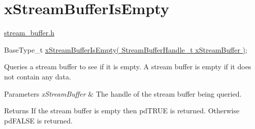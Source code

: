 \hypertarget{group__x_stream_buffer_is_empty}{}\section{x\+Stream\+Buffer\+Is\+Empty}
\label{group__x_stream_buffer_is_empty}
\hyperlink{stream__buffer_8h}{stream\+\_\+buffer.\+h}


\begin{DoxyPre}
BaseType\_t \hyperlink{stream__buffer_8h_af65cd558025ddc29ca68fba1b3f5dc19}{xStreamBufferIsEmpty( StreamBufferHandle\_t xStreamBuffer )};
\end{DoxyPre}


Queries a stream buffer to see if it is empty. A stream buffer is empty if it does not contain any data.


\begin{DoxyParams}{Parameters}
{\em x\+Stream\+Buffer} & The handle of the stream buffer being queried.\\
\hline
\end{DoxyParams}
\begin{DoxyReturn}{Returns}
If the stream buffer is empty then pd\+T\+R\+UE is returned. Otherwise pd\+F\+A\+L\+SE is returned. 
\end{DoxyReturn}
